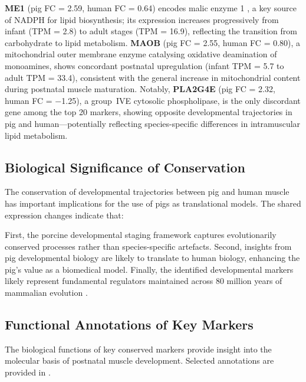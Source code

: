 \textbf{ME1} (pig FC = 2.59, human FC = 0.64) encodes malic enzyme 1 \parencite{simmen_malic_2020}, a key source of NADPH for lipid biosynthesis; its expression increases progressively from infant (TPM = 2.8) to adult stages (TPM = 16.9), reflecting the transition from carbohydrate to lipid metabolism. \textbf{MAOB} (pig FC = 2.55, human FC = 0.80), a mitochondrial outer membrane enzyme catalysing oxidative deamination of monoamines, shows concordant postnatal upregulation (infant TPM = 5.7 to adult TPM = 33.4), consistent with the general increase in mitochondrial content during postnatal muscle maturation. Notably, \textbf{PLA2G4E} (pig FC = 2.32, human FC = $-$1.25), a group~IVE cytosolic phospholipase, is the only discordant gene among the top 20 markers, showing opposite developmental trajectories in pig and human---potentially reflecting species-specific differences in intramuscular lipid metabolism.

\subsection{Biological Significance of Conservation}

The conservation of developmental trajectories between pig and human muscle has important implications for the use of pigs as translational models. The shared expression changes indicate that:

First, the porcine developmental staging framework captures evolutionarily conserved processes rather than species-specific artefacts. Second, insights from pig developmental biology are likely to translate to human biology, enhancing the pig's value as a biomedical model. Finally, the identified developmental markers likely represent fundamental regulators maintained across 80 million years of mammalian evolution \parencite{kumar_timetree_2022}.

\subsection{Functional Annotations of Key Markers}

The biological functions of key conserved markers provide insight into the molecular basis of postnatal muscle development. Selected annotations are provided in .

